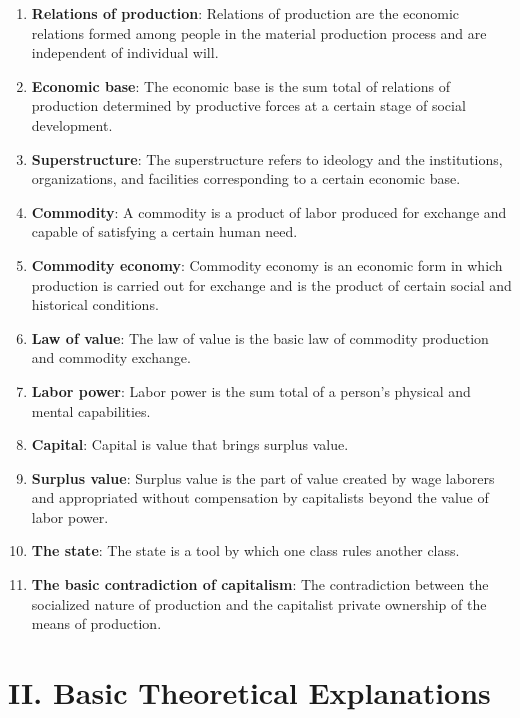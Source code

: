 \documentclass[12pt,a4paper]{ctexart}
\begin{document}
\begin{enumerate}[leftmargin=2em]
    \item \textbf{Relations of production}: Relations of production are the economic relations formed among people in the material production process and are independent of individual will.
    
    \item \textbf{Economic base}: The economic base is the sum total of relations of production determined by productive forces at a certain stage of social development.
    
    \item \textbf{Superstructure}: The superstructure refers to ideology and the institutions, organizations, and facilities corresponding to a certain economic base.
    
    \item \textbf{Commodity}: A commodity is a product of labor produced for exchange and capable of satisfying a certain human need.
    
    \item \textbf{Commodity economy}: Commodity economy is an economic form in which production is carried out for exchange and is the product of certain social and historical conditions.
    
    \item \textbf{Law of value}: The law of value is the basic law of commodity production and commodity exchange.
    
    \item \textbf{Labor power}: Labor power is the sum total of a person's physical and mental capabilities.
    
    \item \textbf{Capital}: Capital is value that brings surplus value.
    
    \item \textbf{Surplus value}: Surplus value is the part of value created by wage laborers and appropriated without compensation by capitalists beyond the value of labor power.
    
    \item \textbf{The state}: The state is a tool by which one class rules another class.
    
    \item \textbf{The basic contradiction of capitalism}: The contradiction between the socialized nature of production and the capitalist private ownership of the means of production.
\end{enumerate}

\section{II. Basic Theoretical Explanations}
\end{document}
